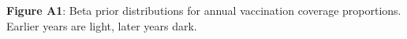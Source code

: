 \textbf{Figure A1}: Beta prior distributions for annual vaccination coverage proportions. Earlier years are light, later years dark.